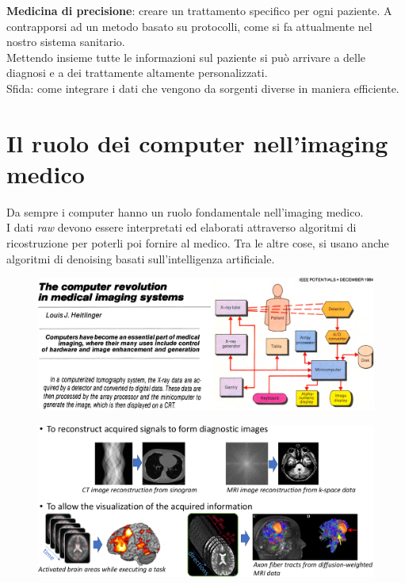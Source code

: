 \textbf{Medicina di precisione}: creare un trattamento specifico per ogni paziente. A contrapporsi ad un metodo basato su protocolli, come si fa attualmente nel nostro sistema sanitario.\\
Mettendo insieme tutte le informazioni sul paziente si può arrivare a delle diagnosi e a dei trattamente altamente personalizzati.\\
Sfida: come integrare i dati che vengono da sorgenti diverse in maniera efficiente.\\

\section{Il ruolo dei computer nell'imaging medico}
Da sempre i computer hanno un ruolo fondamentale nell'imaging medico.\\
I dati \textit{raw} devono essere interpretati ed elaborati attraverso algoritmi di ricostruzione per poterli poi fornire al medico. Tra le altre cose, si usano anche algoritmi di denoising basati sull'intelligenza artificiale.\\

\begin{figure}[ht]
	\centering
	\includegraphics[width=1\linewidth]{figure_med/computers}
\end{figure}
\FloatBarrier


\begin{figure}[ht]
	\centering
	\includegraphics[width=1\linewidth]{figure_med/computer_role}
\end{figure}
\FloatBarrier

